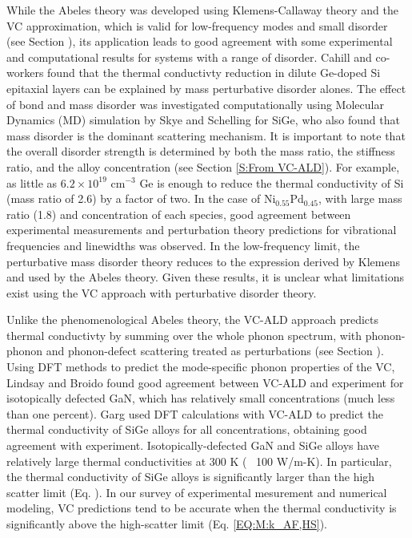 \documentclass[aps,prb,onecolumn,preprint,superscriptaddress,amsmath,amssymb,floatfix]{revtex4}
\begin{document}
While the Abeles theory was developed using Klemens-Callaway theory 
and the VC approximation,
which is valid for low-frequency modes and  
small disorder (see Section ), its application leads to good agreement with
some experimental and computational results for systems with 
a range of disorder. 
Cahill and co-workers found that the thermal conductivty 
reduction in dilute Ge-doped Si epitaxial layers 
can be explained by mass perturbative disorder alones.
\cite{cahill_thermal_2004,cahill_thermal_2005} 
The effect of bond and mass disorder was investigated computationally 
using Molecular Dynamics (MD) simulation by Skye and 
Schelling for SiGe,\cite{skye_thermal_2008} 
who also found that mass disorder is the dominant scattering mechanism. 
It is important to note that 
the overall disorder strength is determined by both the mass ratio, 
the stiffness ratio, and 
the alloy concentration (see Section \ref{S:From VC-ALD}). 
For example, as little as $6.2\times10^{19}$ cm$^{-3}$ Ge  
is enough to reduce the thermal conductivity of 
Si (mass ratio of 2.6) by a factor of two.\cite{cahill_thermal_2004} 
In the case of Ni$_{0.55}$Pd$_{0.45}$, 
with large mass ratio (1.8) and concentration of each species, 
good agreement between experimental measurements and 
perturbation theory predictions 
for vibrational frequencies and linewidths was observed.
\cite{mattis_phonon_1957,kamitakahara_vibrations_1974} 
In the low-frequency 
limit, the perturbative mass disorder theory\cite{mattis_phonon_1957} 
reduces to the expression derived by Klemens
\cite{klemens_scattering_1955,klemens_thermal_1957} and 
used by the Abeles theory.\cite{abeles_lattice_1963}
Given these results, it is unclear what limitations exist 
using the VC approach with perturbative disorder theory.
\cite{mattis_phonon_1957,abeles_lattice_1963,tamura_isotope_1983}

Unlike the phenomenological 
Abeles theory, the VC-ALD approach predicts thermal conductivty 
by summing over the whole phonon spectrum, with  
phonon-phonon and phonon-defect scattering treated as perturbations 
(see Section ).\cite{garg_role_2011,tian_phonon_2012,lindsay_thermal_2012} 
Using DFT methods to predict 
the mode-specific phonon properties of the VC, Lindsay and Broido 
found good agreement between VC-ALD and experiment for 
isotopically defected GaN, which has relatively small concentrations
(much less than one percent).\cite{lindsay_thermal_2012} 
Garg used DFT calculations with VC-ALD   
to predict the thermal conductivity of SiGe alloys 
for all concentrations, obtaining good agreement with experiment.
\cite{garg_role_2011}  
Isotopically-defected GaN and SiGe alloys have relatively large 
thermal conductivities at 300 K (~ 100 W/m-K). In 
particular, the thermal conductivity of SiGe alloys is significantly 
larger than the high scatter limit (Eq. ).
\cite{cahill_lattice_1988}  
In our survey of experimental mesurement and numerical modeling, 
VC predictions tend to be accurate when the thermal conductivity 
is significantly above the high-scatter limit (Eq. \eqref{EQ:M:k_AF,HS}).
\cite{abeles_lattice_1963,kamitakahara_vibrations_1974,
cahill_thermal_2004,cahill_thermal_2005,
cahill_lattice_1988,garg_role_2011,lindsay_thermal_2012} 
\end{document}
